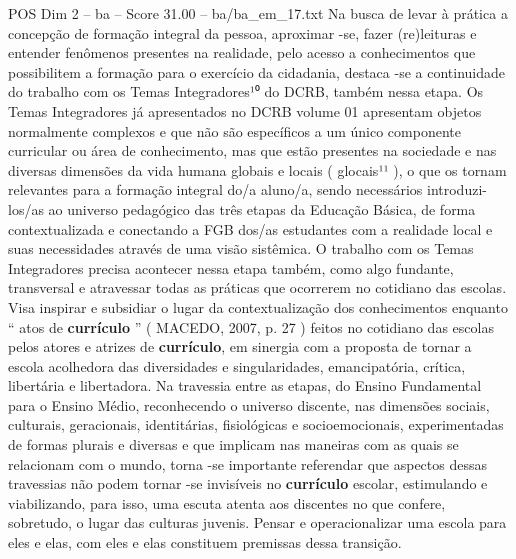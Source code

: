 \begin{textsample}{POS Dim 2 – ba – Score 31.00 – ba/ba\_em\_17.txt}
Na busca de levar à prática a concepção de formação integral da pessoa, aproximar -se, fazer (re)leituras e entender fenômenos presentes na realidade, pelo acesso a conhecimentos que possibilitem a formação para o exercício da cidadania, destaca -se a continuidade do trabalho com os Temas Integradores¹⁰ do DCRB, também nessa etapa.
Os Temas Integradores já apresentados no DCRB volume 01 apresentam objetos normalmente complexos e que não são específicos a um único componente curricular ou área de conhecimento, mas que estão presentes na sociedade e nas diversas dimensões da vida humana globais e locais ( glocais¹¹ ), o que os tornam relevantes para a formação integral do/a aluno/a, sendo necessários introduzi-los/as ao universo pedagógico das três etapas da Educação Básica, de forma contextualizada e conectando a FGB dos/as estudantes com a realidade local e suas necessidades através de uma visão sistêmica.
O trabalho com os Temas Integradores precisa acontecer nessa etapa também, como algo fundante, transversal e atravessar todas as práticas que ocorrerem no cotidiano das escolas.
Visa inspirar e subsidiar o lugar da contextualização dos conhecimentos enquanto “ atos de \textbf{currículo} ” ( MACEDO, 2007, p. 27 ) feitos no cotidiano das escolas pelos atores e atrizes de \textbf{currículo}, em sinergia com a proposta de tornar a escola acolhedora das diversidades e singularidades, emancipatória, crítica, libertária e libertadora.
Na travessia entre as etapas, do Ensino Fundamental para o Ensino Médio, reconhecendo o universo discente, nas dimensões sociais, culturais, geracionais, identitárias, fisiológicas e socioemocionais, experimentadas de formas plurais e diversas e que implicam nas maneiras com as quais se relacionam com o mundo, torna -se importante referendar que aspectos dessas travessias não podem tornar -se invisíveis no \textbf{currículo} escolar, estimulando e viabilizando, para isso, uma escuta atenta aos discentes no que confere, sobretudo, o lugar das culturas juvenis.
Pensar e operacionalizar uma escola para eles e elas, com eles e elas constituem premissas dessa transição.

\end{textsample}
